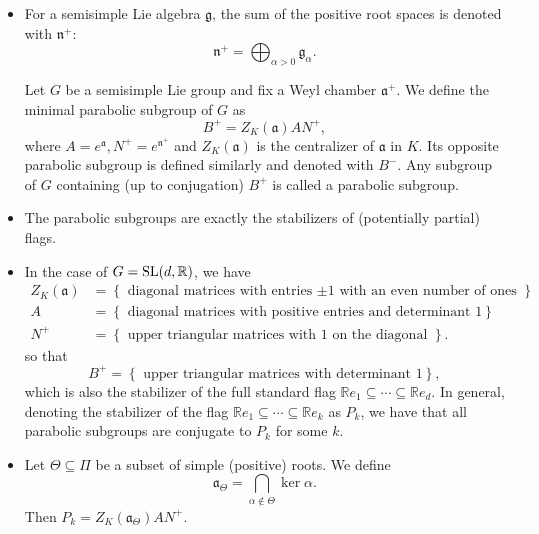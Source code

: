 \documentclass{report}
\begin{document}
\begin{itemize}
        \item 
        For a semisimple Lie algebra $\mathfrak g$, the sum of the positive root spaces is denoted with $\mathfrak n^+$:
        \[
        \mathfrak n^+ = \bigoplus_{\alpha > 0} \mathfrak g_\alpha.
        \]
        \begin{definition}
            Let $G$ be a semisimple Lie group and fix a Weyl chamber $\mathfrak a^+$.
            We define the minimal parabolic subgroup of $G$ as
            \[
            B^+ = Z_K(\mathfrak a) A N^+,
            \]
            where $A = e^{\mathfrak a}, N^+ = e^{\mathfrak n^+}$ and $Z_K(\mathfrak a)$ is the centralizer of $\mathfrak a$ in $K$.
            Its opposite parabolic subgroup is defined similarly and denoted with $B^-$.
            Any subgroup of $G$ containing (up to conjugation) $B^+$ is called a parabolic subgroup.
        \end{definition}
        \item The parabolic subgroups are exactly the stabilizers of (potentially partial) flags.
        \item  
        In the case of $G = \operatorname{{\mathrm{SL}}}(d,\mathbb R)$, we have
        \begin{align*}
            Z_K(\mathfrak a) &= \left\{ \text{ diagonal matrices with entries $\pm 1$ with an even number of ones } \right\}\\
            A &= \left\{ \text{ diagonal matrices with positive entries and determinant } 1 \right\}\\
            N^+ &= \left\{ \text{ upper triangular matrices with $1$ on the diagonal } \right\}.
        \end{align*}
        so that
        \[
        B^+ = \left\{ \text{ upper triangular matrices with determinant } 1 \right\},
        \]
        which is also the stabilizer of the full standard flag $\mathbb R e_1 \subseteq \cdots \subseteq \mathbb R e_d$.
        In general, denoting the stabilizer of the flag $\mathbb R e_1 \subseteq \cdots \subseteq \mathbb R e_k$ as $P_k$, we have that all parabolic subgroups are conjugate to $P_k$ for some $k$.
        \item Let $\Theta \subseteq \Pi$ be a subset of simple (positive) roots.
        We define 
        \[
        \mathfrak a_\Theta = \bigcap_{\alpha \not \in \Theta} \ker \alpha.
        \]
        Then $P_k = Z_K(\mathfrak a_\Theta) A N^+$.
\end{itemize}
\end{document}
